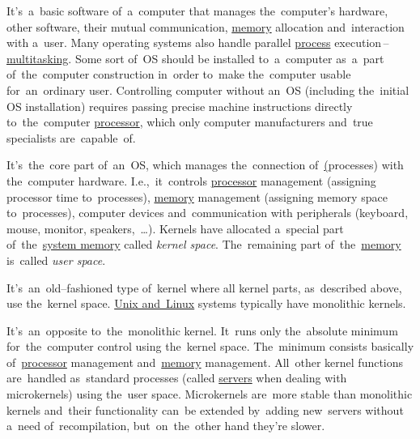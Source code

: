 
\label{os}
It's~a~basic software of~a~computer that manages the~computer's hardware, other software, their mutual communication, \hyperref[systemmemory]{memory} allocation and~interaction with a~user. Many operating systems also handle parallel \hyperref[applicationprocessprogramservicethread]{process} execution\,--\,\hyperref[multitasking]{multitasking}. Some sort of~OS should be installed to~a~computer as~a~part of~the~computer construction in~order to~make the~computer usable for~an~ordinary user. Controlling computer without an~OS (including the~initial OS installation) requires passing precise machine instructions directly to~the~computer \hyperref[processorcpucore]{processor}, which only computer manufacturers and~true specialists are~capable~of.

\label{kernel}
It's~the~core part of~an~OS, which manages the~connection of~\hyperref[applicationprocessprogramservicethread](processes) with the~computer hardware. I.e.,~it~controls \hyperref[processorcpucore]{processor} management (assigning processor time to~processes), \hyperref[systemmemory]{memory} management (assigning memory space to~processes), computer devices and~communication with peripherals (keyboard, mouse, monitor, speakers,~\dots). Kernels have allocated a~special part of~the~\hyperref[systemmemory]{system memory} called \textit{kernel space}. The~remaining part of~the~\hyperref[systemmemory]{memory} is~called \textit{user space}.

\label{monolithickernel}
It's~an~old--fashioned type of~kernel where all kernel parts, as~described above, use the~kernel space. \hyperref[unixlinux]{Unix and~Linux} systems typically have monolithic kernels.

\label{microkernel}
It's~an~opposite to~the~monolithic kernel. It~runs only the~absolute minimum for~the~computer control using the~kernel space. The~minimum consists basically of~\hyperref[processorcpucore]{processor} management and~\hyperref[systemmemory]{memory} management. All~other kernel functions are~handled as~standard processes (called \hyperref[server]{servers} when dealing with microkernels) using the~user space. Microkernels are~more stable than monolithic kernels and~their functionality can~be extended by~adding new~servers without a~need of~recompilation, but~on~the~other hand they're slower.

